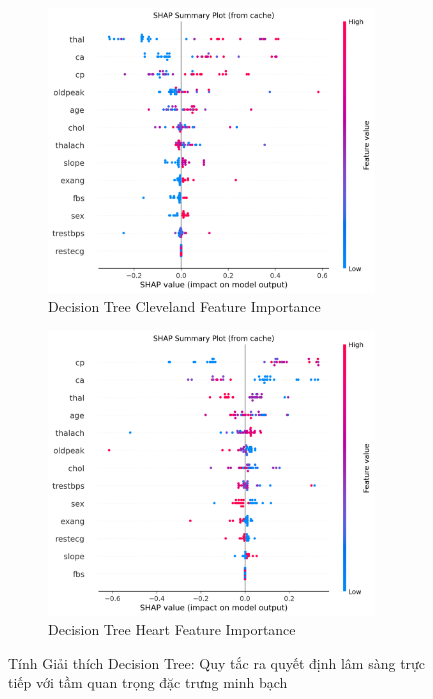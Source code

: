 \begin{figure}[H]
\centering
\begin{subfigure}[b]{0.48\textwidth}
\centering
\includegraphics[width=0.95\textwidth]{Result/cleveland_dataset/DT/SHAP/Summary.png}
\caption{Decision Tree Cleveland Feature Importance}
\label{fig:dt_shap_cleveland_analysis}
\end{subfigure}
\hfill
\begin{subfigure}[b]{0.48\textwidth}
\centering
\includegraphics[width=0.95\textwidth]{Result/heart_dataset/DT/SHAP/Summary.png}
\caption{Decision Tree Heart Feature Importance}
\label{fig:dt_shap_heart_analysis}
\end{subfigure}
\caption{Tính Giải thích Decision Tree: Quy tắc ra quyết định lâm sàng trực tiếp với tầm quan trọng đặc trưng minh bạch}
\label{fig:decision_tree_complete}
\end{figure}

